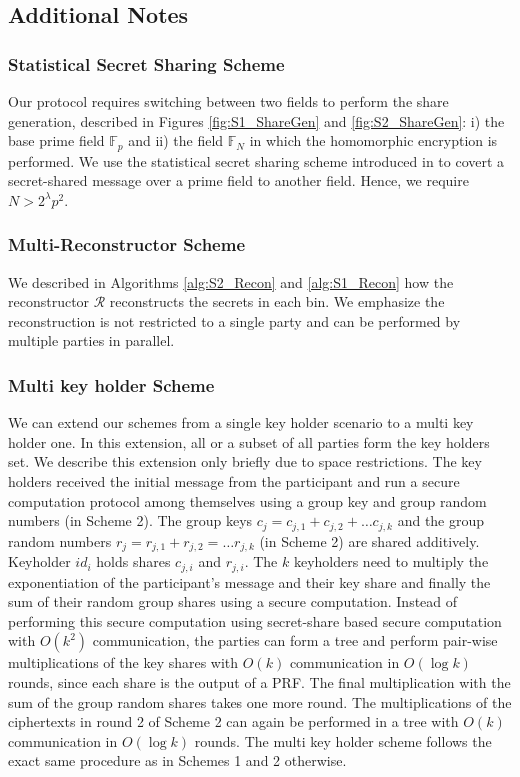 \subsection{Additional Notes}
\label{sec:addnotes}
\subsubsection{Statistical Secret Sharing Scheme}
Our protocol requires switching between two fields to perform the share generation, described in Figures \ref{fig:S1_ShareGen} and \ref{fig:S2_ShareGen}: i) the base prime field $\mathbb{F}_p$ and ii) the field $\mathbb{F}_N$ in which the homomorphic encryption is performed. We use the statistical secret sharing scheme introduced in  \cite{Statistical_SSS} to covert a secret-shared message over a prime field to another field.  Hence, we require $N > 2^\lambda p^2$.
\subsubsection{Multi-Reconstructor Scheme}
We described in Algorithms \ref{alg:S2_Recon} and \ref{alg:S1_Recon} how the reconstructor $\mathcal{R}$ reconstructs the secrets in each bin. We emphasize the reconstruction is not restricted to a single party and can be performed by multiple parties in parallel. 
\subsubsection{Multi key holder Scheme} \label{Multi-Key-Holder}
We can extend our schemes from a single key holder scenario to a multi key holder one. In this extension, all or a subset of all parties form the key holders set. 
We describe this extension only briefly due to space restrictions.
The key holders received the initial message from the participant and run a secure computation protocol among themselves using a group key and group random numbers (in Scheme 2).
The group keys $c_j = c_{j,1} + c_{j,2} + \ldots c_{j,k}$ and the group random numbers $r_j = r_{j,1} + r_{j,2} = \ldots r_{j,k}$ (in Scheme 2) are shared additively.
Keyholder $id_i$ holds shares $c_{j,i}$ and $r_{j,i}$.
The $k$ keyholders need to multiply the exponentiation of the participant's message and their key share and finally the sum of their random group shares using a secure computation.
Instead of performing this secure computation using secret-share based secure computation with $O(k^2)$ communication, the parties can form a tree and perform pair-wise multiplications of the key shares with $O(k)$ communication in $O(\log k)$ rounds, since each share is the output of a PRF.
The final multiplication with the sum of the group random shares takes one more round.
The multiplications of the ciphertexts in round 2 of Scheme 2 can again be performed in a tree with $O(k)$ communication in $O(\log k)$ rounds.
The multi key holder scheme follows the exact same procedure as in Schemes 1 and 2 otherwise. 
